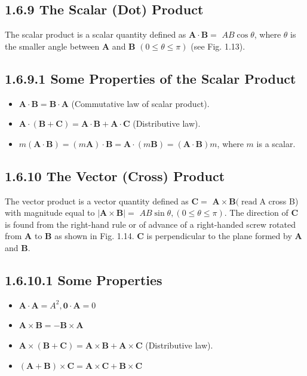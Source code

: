\documentclass[10pt]{article}
\begin{document}
\subsection*{1.6.9 The Scalar (Dot) Product}
The scalar product is a scalar quantity defined as $\mathbf{A} \cdot \mathbf{B}=$ $A B \cos \theta$, where $\theta$ is the smaller angle between $\mathbf{A}$ and $\mathbf{B}$ $(0 \leq \theta \leq \pi)$ (see Fig. 1.13).

\subsection*{1.6.9.1 Some Properties of the Scalar Product}
\begin{itemize}
  \item $\mathbf{A} \cdot \mathbf{B}=\mathbf{B} \cdot \mathbf{A}$ (Commutative law of scalar product).
  \item $\mathbf{A} \cdot(\mathbf{B}+\mathbf{C})=\mathbf{A} \cdot \mathbf{B}+\mathbf{A} \cdot \mathbf{C}$ (Distributive law).
  \item $m(\mathbf{A} \cdot \mathbf{B})=(m \mathbf{A}) \cdot \mathbf{B}=\mathbf{A} \cdot(m \mathbf{B})=(\mathbf{A} \cdot \mathbf{B}) m$, where $m$ is a scalar.
\end{itemize}

\subsection*{1.6.10 The Vector (Cross) Product}
The vector product is a vector quantity defined as $\mathbf{C}=$ $\mathbf{A} \times \mathbf{B}(\operatorname{read} \mathrm{A}$ cross B) with magnitude equal to $|\mathbf{A} \times \mathbf{B}|=$ $A B \sin \theta,(0 \leq \theta \leq \pi)$. The direction of $\mathbf{C}$ is found from the right-hand rule or of advance of a right-handed screw rotated from $\mathbf{A}$ to $\mathbf{B}$ as shown in Fig. 1.14. $\mathbf{C}$ is perpendicular to the plane formed by $\mathbf{A}$ and $\mathbf{B}$.

\subsection*{1.6.10.1 Some Properties}
\begin{itemize}
  \item $\mathbf{A} \cdot \mathbf{A}=A^{2}, \mathbf{0} \cdot \mathbf{A}=0$
  \item $\mathbf{A} \times \mathbf{B}=-\mathbf{B} \times \mathbf{A}$
  \item $\mathbf{A} \times(\mathbf{B}+\mathbf{C})=\mathbf{A} \times \mathbf{B}+\mathbf{A} \times \mathbf{C}$ (Distributive law).
  \item $(\mathbf{A}+\mathbf{B}) \times \mathbf{C}=\mathbf{A} \times \mathbf{C}+\mathbf{B} \times \mathbf{C}$
\end{itemize}
\end{document}
